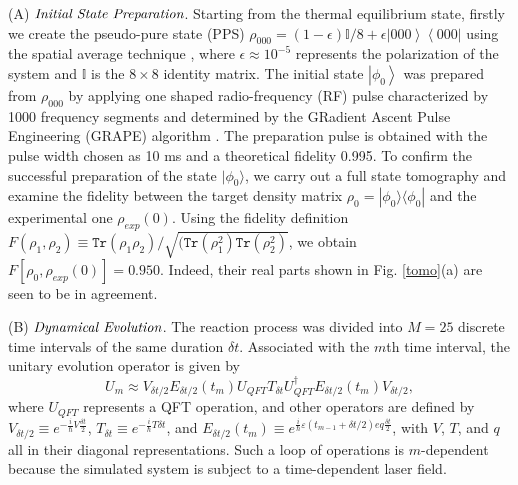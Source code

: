 \documentclass[twocolumn,showpacs,twoside,10pt,prl]{revtex4}
\begin{document}
(A) $\emph{Initial State Preparation}$. Starting from the thermal equilibrium state, firstly we create the pseudo-pure state (PPS) $\rho_{000}=(1-\epsilon)\mathbb{{I}}/8+\epsilon \left\vert 000 \right\rangle \left\langle000\right\vert$ using the spatial average technique \cite{spatial}, where $\epsilon \approx 10^{-5}$ represents the polarization of the system and ${\mathbb{{I}}}$ is the $8\times 8$ identity matrix.
The initial state $\left\vert \phi_{0} \right\rangle$ was prepared from $\rho_{000}$ by applying one shaped radio-frequency
(RF) pulse characterized by 1000 frequency
segments and determined by the GRadient Ascent Pulse Engineering (GRAPE) algorithm \cite{grape1,grape2,grape3}. The preparation pulse is obtained with the pulse width chosen as 10 ms and a theoretical fidelity 0.995. 
To confirm the successful preparation of the state $\vert\phi_0\rangle$,   we carry out
 a full state tomography and examine the fidelity between the target density matrix $\rho_0=|\phi_0\rangle\langle\phi_0|$ and the experimental one $\rho_{exp}(0)$.  Using the
 fidelity definition $F(\rho_{1}, \rho_{2})\equiv \texttt{Tr}(\rho_1{\rho_2})/\sqrt{(\texttt{Tr}(\rho_1^2)\texttt{Tr}(\rho_2^2)}$,
 we obtain $F[\rho_0, \rho_{exp}(0)]=0.950$. Indeed, their real parts shown in Fig. \ref{tomo}(a) are seen to be in agreement.

(B) $\emph{Dynamical Evolution}$. The reaction process was divided into $M=25$ discrete time intervals of the same duration $\delta t$.
Associated with the $m$th time interval, the unitary evolution operator is given by
\begin{equation}
U_m\approx V_{\delta t/2}{E}_{\delta t/2}(t_m)U_{QFT}T_{\delta t}U_{QFT}^{\dagger}{E}_{\delta t/2}(t_{m}){V}_{\delta t/2},
\end{equation}
where $U_{QFT}$ represents a QFT operation, and other operators are defined by ${V}_{\delta t/2}\equiv e^{-\frac{i}{\hbar}{V}\frac{\delta t}{2}}$, ${T}_{\delta t} \equiv e^{-\frac{i}{\hbar}{T}\delta t}$, and ${E}_{\delta t/2}(t_m)\equiv e^{\frac{i}{\hbar}\varepsilon(t_{m-1}+\delta t/2) e q\frac{\delta t}{2}}$, with $V$, $T$, and $q$ all in their diagonal representations.  Such a loop of operations is $m$-dependent because the simulated system is subject to a time-dependent laser field.  
\end{document}
